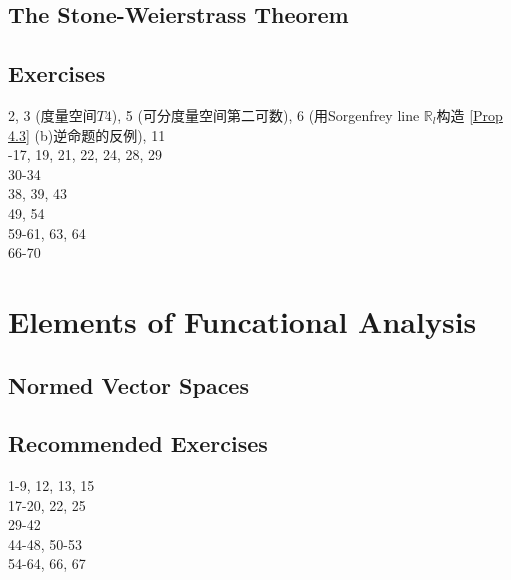 \documentclass[hidelinks]{article}
\theoremstyle{definition}
\theoremstyle{plain}
\theoremstyle{remark}
\begin{document}
\subsection{The Stone-Weierstrass Theorem}



\subsection{Exercises}
2, 3 (度量空间$T4$), 5 (可分度量空间第二可数), 6 (用Sorgenfrey line $\mathbb{R}_l$构造 \autoref{Prop 4.3} (b)逆命题的反例), 11 \\
-17, 19, 21, 22, 24, 28, 29 \\
30-34 \\
38, 39, 43 \\
49, 54 \\
59-61, 63, 64 \\
66-70 \\
\newpage


\section{Elements of Funcational Analysis}

\subsection{Normed Vector Spaces}










\subsection{Recommended Exercises}
1-9, 12, 13, 15 \\
17-20, 22, 25 \\
29-42 \\
44-48, 50-53 \\
54-64, 66, 67 \\
\end{document}

